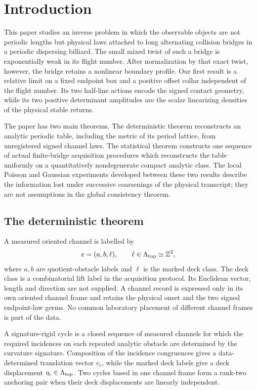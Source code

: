 \section{Introduction}
\label{sec:introduction}

This paper studies an inverse problem in which the observable objects are not
periodic lengths but physical laws attached to long alternating collision
bridges in a periodic dispersing billiard.  The small mixed twist of such a
bridge is exponentially weak in its flight number.  After normalization by
that exact twist, however, the bridge retains a nonlinear boundary profile.
Our first result is a relative limit on a fixed endpoint box and a positive
offset collar independent of the flight number.  Its two half-line actions
encode the signed contact geometry, while its two positive determinant
amplitudes are the scalar linearizing densities of the physical stable
returns.

The paper has two main theorems.  The deterministic theorem reconstructs an
analytic periodic table, including the metric of its period lattice, from
unregistered signed channel laws.  The statistical theorem constructs one
sequence of actual finite-bridge acquisition procedures which reconstructs
the table uniformly on a quantitatively nondegenerate compact analytic class.
The local Poisson and Gaussian experiments developed between these two
results describe the information lost under successive coarsenings of the
physical transcript; they are not assumptions in the global consistency
theorem.

\subsection{The deterministic theorem}

A measured oriented channel is labelled by
\[
                         e=(a,b,\ell),
 \qquad \ell\in\Lambda_{\rm top}\simeq\mathbb Z^2,
\]
where \(a,b\) are quotient-obstacle labels and \(\ell\) is the marked deck
class.  The deck class is a combinatorial lift label in the acquisition
protocol.  Its Euclidean vector, length and direction are not supplied.  A
channel record is expressed only in its own oriented channel frame and
retains the physical onset and the two signed endpoint-law germs.  No common
laboratory placement of different channel frames is part of the data.

A signature-rigid cycle is a closed sequence of measured channels for which
the required incidences on each repeated analytic obstacle are determined by
the curvature signature.  Composition of the incidence congruences gives a
data-determined translation vector \(v_c\), while the marked deck labels give
a deck displacement \(\eta_c\in\Lambda_{\rm top}\).  Two cycles based in one
channel frame form a rank-two anchoring pair when their deck displacements are
linearly independent.

